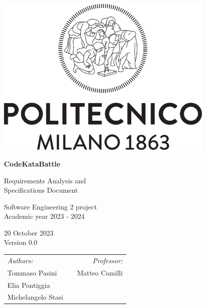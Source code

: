 
\begin{titlepage}
    \begin{center}
        \includegraphics[width=0.8\textwidth]{images/PoliMi_Logo.png}

        \vspace*{2cm}
        \textbf{\huge CodeKataBattle}

        \vspace{0.5cm}
        \LARGE Requirements Analysis and\\Specifications Document

        \vspace{1.5cm}
        \normalsize Software Engineering 2 project\\
        Academic year 2023 - 2024

        \vspace{0.5cm}
        20 October 2023\\
        Version 0.0

        \vspace{1cm}
        \small
        \begin{table}[b]
            \centering
            \begin{tabular}{l p{5.5cm} l}
                \textit{Authors:}   &  & \multicolumn{1}{r}{\textit{Professor:}} \\
                Tommaso Pasini      &  & \multicolumn{1}{r}{Matteo Camilli}      \\
                Elia Pontiggia      &  & \textbf{}                               \\
                Michelangelo Stasi  &  & \textbf{}
            \end{tabular}
        \end{table}

    \end{center}
\end{titlepage}